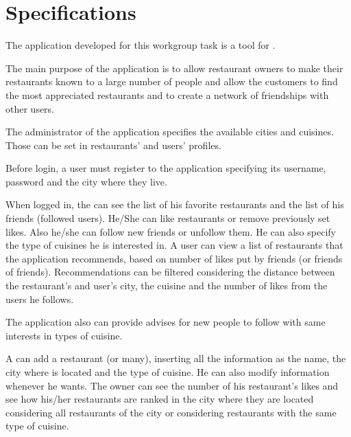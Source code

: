 \chapter{Specifications}\label{ch:specs}

The application developed for this workgroup task is a tool for
.

The main purpose of the application is to allow restaurant owners to make their
restaurants known to a large number of people and allow the customers to find
the most appreciated restaurants and to create a network of friendships with
other users.

The administrator of the application specifies the available cities and
cuisines. Those can be set in restaurants' and users' profiles.

Before login, a user must register to the application specifying its username,
password and the city where they live.

When logged in, the  can see the list of his favorite
restaurants and the list of his friends (followed users). He/She can like
restaurants or remove previously set likes. Also he/she can
follow new friends or unfollow them. He can also specify the
type of cuisines he is interested in. A user can view a list of
restaurants that the application recommends, based on number of likes put by
friends (or friends of friends). Recommendations can be filtered considering
the distance between the restaurant's and user's city, the cuisine and the
number of likes from the users he follows.

The application also can provide advises for new people to follow with same
interests in types of cuisine.

A  can add a restaurant (or many), inserting all the
information as the name, the city where is located and the type of cuisine. He
can also modify information whenever he wants. The owner can see the number of
his restaurant's likes and see how his/her restaurants are ranked in the city
where they are located considering all restaurants of the city or considering
restaurants with the same type of cuisine.
